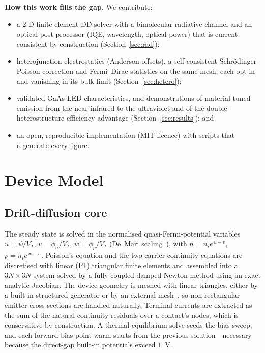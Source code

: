 \documentclass[conference]{IEEEtran}
\begin{document}
\noindent\textbf{How this work fills the gap.} We contribute:
\begin{itemize}
\item a 2-D finite-element DD solver with a bimolecular radiative channel and an
optical post-processor (IQE, wavelength, optical power) that is current-consistent
by construction (Section~\ref{sec:rad});
\item heterojunction electrostatics (Anderson offsets), a self-consistent
Schr\"odinger--Poisson correction and Fermi--Dirac statistics on the same mesh,
each opt-in and vanishing in its bulk limit (Section~\ref{sec:hetero});
\item validated GaAs LED characteristics, and demonstrations of material-tuned
emission from the near-infrared to the ultraviolet and of the
double-heterostructure efficiency advantage (Section~\ref{sec:results}); and
\item an open, reproducible implementation (MIT licence) with scripts that
regenerate every figure.
\end{itemize}

\section{Device Model}
\label{sec:model}

\subsection{Drift-diffusion core}
The steady state is solved in the normalised quasi-Fermi-potential variables
$u=\psi/V_T$, $v=\phi_n/V_T$, $w=\phi_p/V_T$ (De~Mari scaling~\cite{demari}), with
$n=n_ie^{\,u-v}$, $p=n_ie^{\,w-u}$. Poisson's equation and the two carrier
continuity equations are discretised with linear (P1) triangular finite elements
and assembled into a $3N\times3N$ system solved by a fully-coupled damped Newton
method using an exact analytic Jacobian. The device geometry is meshed with
linear triangles, either by a built-in structured generator or by an external
mesh~\cite{gmsh}, so non-rectangular emitter cross-sections are handled naturally.
Terminal currents are extracted as the sum of the natural continuity residuals
over a contact's nodes, which is conservative by construction. A thermal-equilibrium solve seeds the bias sweep,
and each forward-bias point warm-starts from the previous solution---necessary
because the direct-gap built-in potentials exceed $1$~V.
\end{document}
